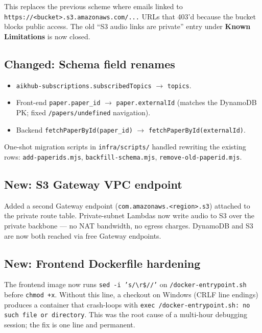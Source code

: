 \documentclass[11pt,a4paper]{article}
\begin{document}
This replaces the previous scheme where emails linked to
\texttt{https://<bucket>.s3.amazonaws.com/...} URLs that 403'd because the
bucket blocks public access. The old ``S3 audio links are private''
entry under \textbf{Known Limitations} is now closed.

\subsection{Changed: Schema field renames}

\begin{itemize}[leftmargin=*]
  \item \texttt{aikhub-subscriptions.subscribedTopics} $\rightarrow$
        \texttt{topics}.
  \item Front-end \texttt{paper.paper\_id} $\rightarrow$
        \texttt{paper.externalId} (matches the DynamoDB PK; fixed
        \texttt{/papers/undefined} navigation).
  \item Backend \texttt{fetchPaperById(paper\_id)} $\rightarrow$
        \texttt{fetchPaperById(externalId)}.
\end{itemize}

One-shot migration scripts in \texttt{infra/scripts/} handled rewriting
the existing rows:
\texttt{add-paperids.mjs}, \texttt{backfill-schema.mjs},
\texttt{remove-old-paperid.mjs}.

\subsection{New: S3 Gateway VPC endpoint}

Added a second Gateway endpoint (\texttt{com.amazonaws.<region>.s3})
attached to the private route table. Private-subnet Lambdas now write
audio to S3 over the private backbone --- no NAT bandwidth, no egress
charges. DynamoDB and S3 are now both reached via free Gateway
endpoints.

\subsection{New: Frontend Dockerfile hardening}

The frontend image now runs \texttt{sed -i 's/\textbackslash r\$//'} on
\texttt{/docker-entrypoint.sh} before \texttt{chmod +x}. Without this
line, a checkout on Windows (CRLF line endings) produces a container
that crash-loops with \texttt{exec /docker-entrypoint.sh: no such file
or directory}. This was the root cause of a multi-hour debugging
session; the fix is one line and permanent.
\end{document}
